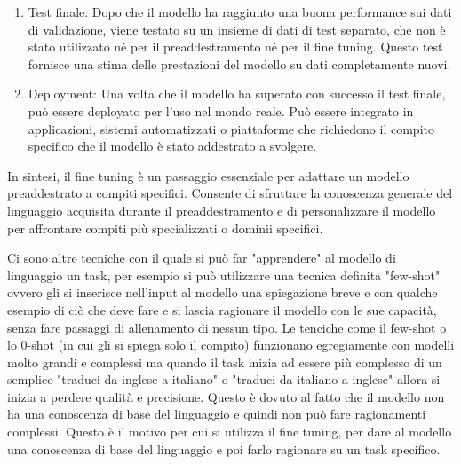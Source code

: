 \begin{enumerate}
    \item Test finale: Dopo che il modello ha raggiunto una buona performance sui dati di validazione, viene testato su un insieme di dati di test separato, che non è stato utilizzato né per il preaddestramento né per il fine tuning. Questo test fornisce una stima delle prestazioni del modello su dati completamente nuovi.
    \item Deployment: Una volta che il modello ha superato con successo il test finale, può essere deployato per l'uso nel mondo reale. Può essere integrato in applicazioni, sistemi automatizzati o piattaforme che richiedono il compito specifico che il modello è stato addestrato a svolgere.
    
\end{enumerate}
In sintesi, il fine tuning è un passaggio essenziale per adattare un modello preaddestrato a compiti specifici. Consente di sfruttare la conoscenza generale del linguaggio acquisita durante il preaddestramento e di personalizzare il modello per affrontare compiti più specializzati o dominii specifici.

Ci sono altre tecniche con il quale si può far "apprendere" al modello di linguaggio un task, per esempio si può utilizzare una tecnica definita "few-shot" ovvero gli si inserisce nell'input al modello una spiegazione breve e con qualche esempio di ciò che deve fare e si lascia ragionare il modello con le sue capacità, senza fare passaggi di allenamento di nessun tipo. Le tenciche come il few-shot o lo 0-shot (in cui gli si spiega solo il compito) funzionano egregiamente con modelli molto grandi e complessi ma quando il task inizia ad essere più complesso di un semplice "traduci da inglese a italiano" o "traduci da italiano a inglese" allora si inizia a perdere qualità e precisione. Questo è dovuto al fatto che il modello non ha una conoscenza di base del linguaggio e quindi non può fare ragionamenti complessi. Questo è il motivo per cui si utilizza il fine tuning, per dare al modello una conoscenza di base del linguaggio e poi farlo ragionare su un task specifico.